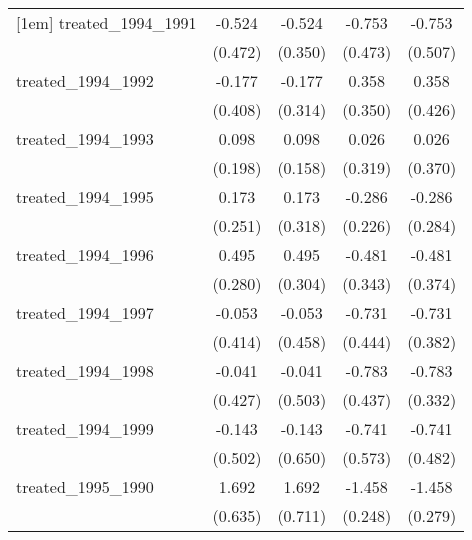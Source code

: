 {\begin{tabular}{l*{4}{c}}
[1em]
treated\_1994\_1991&      -0.524         &      -0.524         &      -0.753         &      -0.753         \\
            &     (0.472)         &     (0.350)         &     (0.473)         &     (0.507)         \\
[1em]
treated\_1994\_1992&      -0.177         &      -0.177         &       0.358         &       0.358         \\
            &     (0.408)         &     (0.314)         &     (0.350)         &     (0.426)         \\
[1em]
treated\_1994\_1993&       0.098         &       0.098         &       0.026         &       0.026         \\
            &     (0.198)         &     (0.158)         &     (0.319)         &     (0.370)         \\
[1em]
treated\_1994\_1995&       0.173         &       0.173         &      -0.286         &      -0.286         \\
            &     (0.251)         &     (0.318)         &     (0.226)         &     (0.284)         \\
[1em]
treated\_1994\_1996&       0.495         &       0.495         &      -0.481         &      -0.481         \\
            &     (0.280)         &     (0.304)         &     (0.343)         &     (0.374)         \\
[1em]
treated\_1994\_1997&      -0.053         &      -0.053         &      -0.731         &      -0.731         \\
            &     (0.414)         &     (0.458)         &     (0.444)         &     (0.382)         \\
[1em]
treated\_1994\_1998&      -0.041         &      -0.041         &      -0.783         &      -0.783\sym{*}  \\
            &     (0.427)         &     (0.503)         &     (0.437)         &     (0.332)         \\
[1em]
treated\_1994\_1999&      -0.143         &      -0.143         &      -0.741         &      -0.741         \\
            &     (0.502)         &     (0.650)         &     (0.573)         &     (0.482)         \\
[1em]
treated\_1995\_1990&       1.692\sym{**} &       1.692\sym{*}  &      -1.458\sym{***}&      -1.458\sym{***}\\
            &     (0.635)         &     (0.711)         &     (0.248)         &     (0.279)         \\

\end{tabular}}
